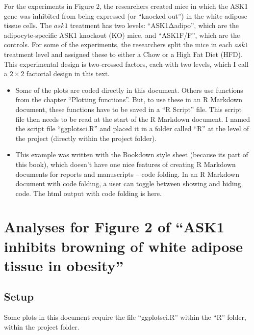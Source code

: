 \documentclass[]{book}
\begin{document}
For the experiments in Figure 2, the researchers created mice in which the ASK1 gene was inhibited from being expressed (or ``knocked out'') in the white adipose tissue cells. The \(ask1\) treatment has two levels: ``ASK1Δadipo'', which are the adipocyte-specific ASK1 knockout (KO) mice, and ``ASK1F/F'', which are the controls. For some of the experiments, the researchers split the mice in each \(ask1\) treatment level and assigned these to either a Chow or a High Fat Diet (HFD). This experimental design is two-crossed factors, each with two levels, which I call a \(2 \times 2\) factorial design in this text.

\begin{itemize}
\item
  Some of the plots are coded directly in this document. Others use functions from the chapter ``Plotting functions''. But, to use these in an R Markdown document, these functions have to be saved in a ``R Script'' file. This script file then needs to be read at the start of the R Markdown document. I named the script file ``ggplotsci.R'' and placed it in a folder called ``R'' at the level of the project (directly within the project folder).
\item
  This example was written with the Bookdown style sheet (because its part of this book), which doesn't have one nice features of creating R Markdown documents for reports and manuscripts -- code folding. In an R Markdown document with code folding, a user can toggle between showing and hiding code. The html output with code folding is here.
\end{itemize}

\hypertarget{analyses-for-figure-2-of-ask1-inhibits-browning-of-white-adipose-tissue-in-obesity}{%
\chapter*{Analyses for Figure 2 of ``ASK1 inhibits browning of white adipose tissue in obesity''}\label{analyses-for-figure-2-of-ask1-inhibits-browning-of-white-adipose-tissue-in-obesity}}

\hypertarget{setup}{%
\section{Setup}\label{setup}}

Some plots in this document require the file ``ggplotsci.R'' within the ``R'' folder, within the project folder.
\end{document}
